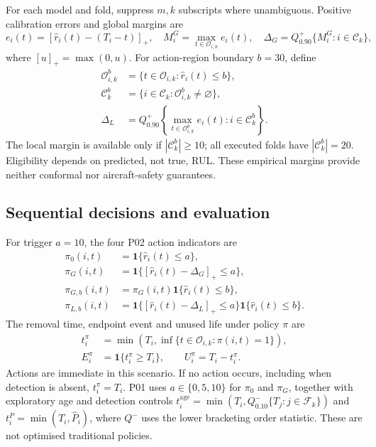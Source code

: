 \documentclass[12pt]{article}
\begin{document}
For each model and fold, suppress $m,k$ subscripts where unambiguous. Positive calibration errors and global margins are
\[
e_i(t)=[\widehat r_i(t)-(T_i-t)]_+,\quad
M_i^{G}=\max_{t\in\mathcal O_{i,k}}e_i(t),\quad
\Delta_G=Q_{0.90}^{+}\{M_i^{G}:i\in\mathcal C_k\},
\]
where $[u]_+=\max(0,u)$. For action-region boundary $b=30$, define
\[
\begin{aligned}
\mathcal O_{i,k}^{b}&=\{t\in\mathcal O_{i,k}:\widehat r_i(t)\leq b\},\\
\mathcal C_k^{b}&=\{i\in\mathcal C_k:\mathcal O_{i,k}^{b}\ne\varnothing\},\\
\Delta_L&=Q_{0.90}^{+}\left\{\max_{t\in\mathcal O_{i,k}^{b}}e_i(t):i\in\mathcal C_k^{b}\right\}.
\end{aligned}
\]
The local margin is available only if $|\mathcal C_k^{b}|\geq10$; all executed folds have $|\mathcal C_k^{b}|=20$. Eligibility depends on predicted, not true, RUL. These empirical margins provide neither conformal nor aircraft-safety guarantees.

\subsection{Sequential decisions and evaluation}

For trigger $a=10$, the four P02 action indicators are
\[
\begin{aligned}
\pi_0(i,t)&=\mathbf1\{\widehat r_i(t)\leq a\},\\
\pi_G(i,t)&=\mathbf1\{[\widehat r_i(t)-\Delta_G]_+\leq a\},\\
\pi_{G,b}(i,t)&=\pi_G(i,t)\mathbf1\{\widehat r_i(t)\leq b\},\\
\pi_{L,b}(i,t)&=\mathbf1\{[\widehat r_i(t)-\Delta_L]_+\leq a\}
\mathbf1\{\widehat r_i(t)\leq b\}.
\end{aligned}
\]
The removal time, endpoint event and unused life under policy $\pi$ are
\[
\begin{aligned}
t_i^{\pi}&=\min\left(T_i,\inf\{t\in\mathcal O_{i,k}:\pi(i,t)=1\}\right),\\
E_i^{\pi}&=\mathbf1\{t_i^{\pi}\geq T_i\},\qquad U_i^{\pi}=T_i-t_i^{\pi}.
\end{aligned}
\]
Actions are immediate in this scenario. If no action occurs, including when detection is absent, $t_i^{\pi}=T_i$. P01 uses $a\in\{0,5,10\}$ for $\pi_0$ and $\pi_G$, together with exploratory age and detection controls $t_i^{\mathrm{age}}=\min(T_i,Q_{0.10}^{-}\{T_j:j\in\mathcal F_k\})$ and $t_i^{P}=\min(T_i,\widehat P_i)$, where $Q^{-}$ uses the lower bracketing order statistic. These are not optimised traditional policies.
\end{document}
